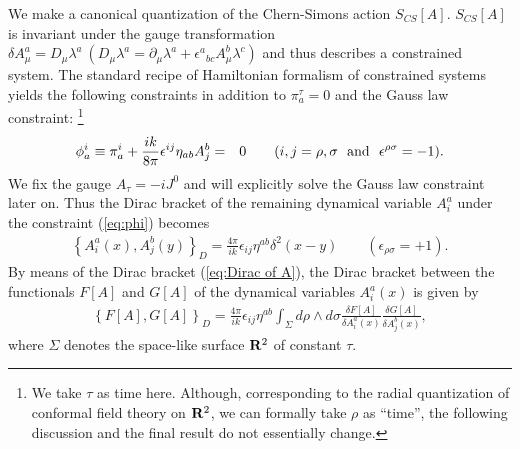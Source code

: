 \documentclass[a4paper,11pt]{article}
\begin{document}
We make a canonical quantization of the Chern-Simons action $S_{CS}[A]$. 
$S_{CS}[A]$ is invariant under the gauge transformation $\delta
A_{\mu}^{a}= D_{\mu} \lambda^{a}~(D_{\mu}\lambda^{a} = 
\partial_{\mu}\lambda^{a}+\epsilon^{a}{}_{bc}A_{\mu}^{b}\lambda^{c})$ 
and thus describes a
constrained system. The standard recipe of Hamiltonian
formalism of constrained systems yields the following constraints 
in addition to $\pi_{a}^{\tau} = 0$ and the Gauss law constraint:
\footnote{We take $\tau$ as time here. Although, corresponding to 
the radial quantization of conformal field theory on ${\bf R}^{2}$, 
we can formally take $\rho$ as ``time'', the following discussion and 
the final result do not essentially change.}
\begin{eqnarray}
\phi_{a}^{i} \equiv \pi_{a}^{i} + \frac{ik}{8\pi}\epsilon^{ij}
\eta_{ab}A_{j}^{b} &=& 0 \qquad (i,j = \rho, \sigma~~{\rm and}~~
\epsilon^{\rho\sigma}=-1). \label{eq:phi}
\end{eqnarray}
We fix the gauge $A_{\tau} = -i J^{0}$ and will 
explicitly solve the Gauss law constraint later on. 
Thus the Dirac bracket of the remaining dynamical 
variable $A_{i}^{a}$ under the constraint
(\ref{eq:phi}) becomes
\begin{eqnarray}
\left\{A_{i}^{a}(x), A_{j}^{b}(y)\right\}_{D} = \frac{4\pi}{ik}
\epsilon_{ij}\eta^{ab}\delta^{2}(x-y)\qquad
(\epsilon_{\rho\sigma}=+1). \label{eq:Dirac of A}
\end{eqnarray}
By means of the Dirac bracket (\ref{eq:Dirac of A}), the Dirac bracket
between the functionals $F[A]$ and $G[A]$ of the dynamical 
variables $A_{i}^{a}(x)$ is given by
\begin{eqnarray}
\left\{F[A], G[A]\right\}_{D} = \frac{4\pi}{ik}
\epsilon_{ij}\eta^{ab}\int_{\Sigma}\!\!d\rho\wedge d\sigma 
\frac{\delta F[A]}{\delta A_{i}^{a}(x)}
\frac{\delta G[A]}{\delta A_{j}^{b}(x)},
\label{eq:Dirac of function}
\end{eqnarray}
where $\Sigma$ denotes the space-like surface ${\bf R}^{2}$ of
constant $\tau$. 
\end{document}
